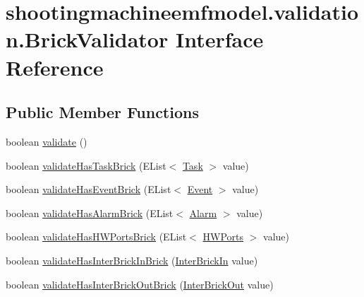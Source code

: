 \hypertarget{interfaceshootingmachineemfmodel_1_1validation_1_1_brick_validator}{\section{shootingmachineemfmodel.\-validation.\-Brick\-Validator Interface Reference}
\label{interfaceshootingmachineemfmodel_1_1validation_1_1_brick_validator}
}
\subsection*{Public Member Functions}
\begin{DoxyCompactItemize}
\item 
boolean \hyperlink{interfaceshootingmachineemfmodel_1_1validation_1_1_brick_validator_ad0711c0cfcb3f5cf85923c2769827fa0}{validate} ()
\item 
boolean \hyperlink{interfaceshootingmachineemfmodel_1_1validation_1_1_brick_validator_abc6ded6c5b3e9004c4f932f2e95f7d59}{validate\-Has\-Task\-Brick} (E\-List$<$ \hyperlink{interfaceshootingmachineemfmodel_1_1_task}{Task} $>$ value)
\item 
boolean \hyperlink{interfaceshootingmachineemfmodel_1_1validation_1_1_brick_validator_a883931b8c7ec583a3f9d5ef5a0188747}{validate\-Has\-Event\-Brick} (E\-List$<$ \hyperlink{interfaceshootingmachineemfmodel_1_1_event}{Event} $>$ value)
\item 
boolean \hyperlink{interfaceshootingmachineemfmodel_1_1validation_1_1_brick_validator_a02f67561de7864db47fc89fa6d6336d9}{validate\-Has\-Alarm\-Brick} (E\-List$<$ \hyperlink{interfaceshootingmachineemfmodel_1_1_alarm}{Alarm} $>$ value)
\item 
boolean \hyperlink{interfaceshootingmachineemfmodel_1_1validation_1_1_brick_validator_a4d616ac1338e0b3c7fda50aa03a3469a}{validate\-Has\-H\-W\-Ports\-Brick} (E\-List$<$ \hyperlink{interfaceshootingmachineemfmodel_1_1_h_w_ports}{H\-W\-Ports} $>$ value)
\item 
boolean \hyperlink{interfaceshootingmachineemfmodel_1_1validation_1_1_brick_validator_a5adb394c0eff4c46d927adea0eb6d766}{validate\-Has\-Inter\-Brick\-In\-Brick} (\hyperlink{interfaceshootingmachineemfmodel_1_1_inter_brick_in}{Inter\-Brick\-In} value)
\item 
boolean \hyperlink{interfaceshootingmachineemfmodel_1_1validation_1_1_brick_validator_a6c1b4f5549b9e5df521ba2ce12e7bef0}{validate\-Has\-Inter\-Brick\-Out\-Brick} (\hyperlink{interfaceshootingmachineemfmodel_1_1_inter_brick_out}{Inter\-Brick\-Out} value)

\end{DoxyCompactItemize}
